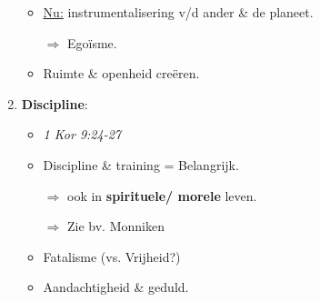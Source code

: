 \begin{enumerate}
\begin{itemize}
		\item \underline{Nu:} instrumentalisering v/d ander \&	de planeet.
		\item[$\Rightarrow$] Ego\"isme.
		\item Ruimte \& openheid cre\"eren.
	\end{itemize}
	\item \textbf{Discipline}:
	\begin{itemize}
		\item \textit{1 Kor 9:24-27}
		\item Discipline \& training = Belangrijk.
		\item[$\Rightarrow$] ook in \textbf{spirituele/ morele} leven.
		\item[$\Rightarrow$] Zie bv. Monniken
		\item Fatalisme (vs. Vrijheid?)
		\item Aandachtigheid \& geduld.
	\end{itemize}
\end{enumerate}
